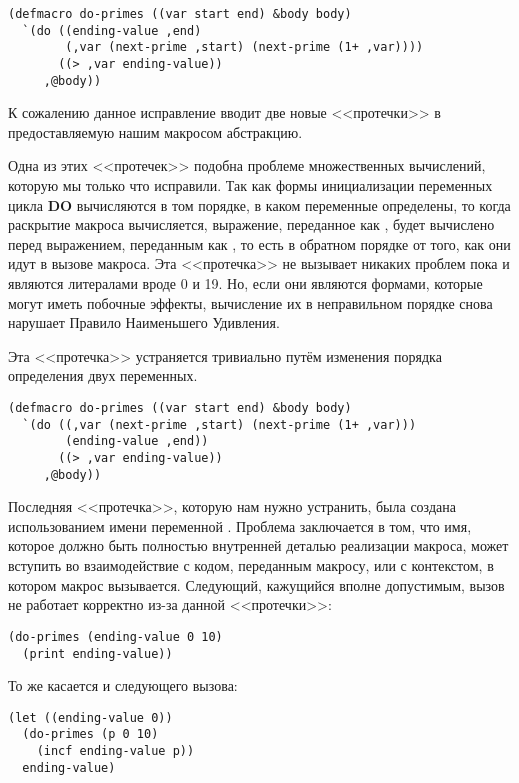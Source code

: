 \begin{lstlisting}
(defmacro do-primes ((var start end) &body body)
  `(do ((ending-value ,end)
        (,var (next-prime ,start) (next-prime (1+ ,var))))
       ((> ,var ending-value))
     ,@body))
\end{lstlisting}

К сожалению данное исправление вводит две новые <<протечки>> в предоставляемую нашим
макросом абстракцию.

Одна из этих <<протечек>> подобна проблеме множественных вычислений, которую мы только что
исправили. Так как формы инициализации переменных цикла \textbf{DO} вычисляются в том
порядке, в каком переменные определены, то когда раскрытие макроса вычисляется, выражение,
переданное как , будет вычислено перед выражением, переданным как ,
то есть в обратном порядке от того, как они идут в вызове макроса. Эта <<протечка>> не
вызывает никаких проблем пока  и  являются литералами вроде 0 и
19. Но, если они являются формами, которые могут иметь побочные эффекты, вычисление их в
неправильном порядке снова нарушает Правило Наименьшего Удивления.

Эта <<протечка>> устраняется тривиально путём изменения порядка определения двух переменных.

\begin{lstlisting}
(defmacro do-primes ((var start end) &body body)
  `(do ((,var (next-prime ,start) (next-prime (1+ ,var)))
        (ending-value ,end))
       ((> ,var ending-value))
     ,@body))
\end{lstlisting}

Последняя <<протечка>>, которую нам нужно устранить, была создана использованием имени
переменной . Проблема заключается в том, что имя, которое должно быть
полностью внутренней деталью реализации макроса, может вступить во взаимодействие с кодом,
переданным макросу, или с контекстом, в котором макрос вызывается. Следующий, кажущийся
вполне допустимым, вызов  не работает корректно из-за данной <<протечки>>:

\begin{lstlisting}
(do-primes (ending-value 0 10)
  (print ending-value))
\end{lstlisting}

То же касается и следующего вызова:

\begin{lstlisting}
(let ((ending-value 0))
  (do-primes (p 0 10)
    (incf ending-value p))
  ending-value)
\end{lstlisting}

